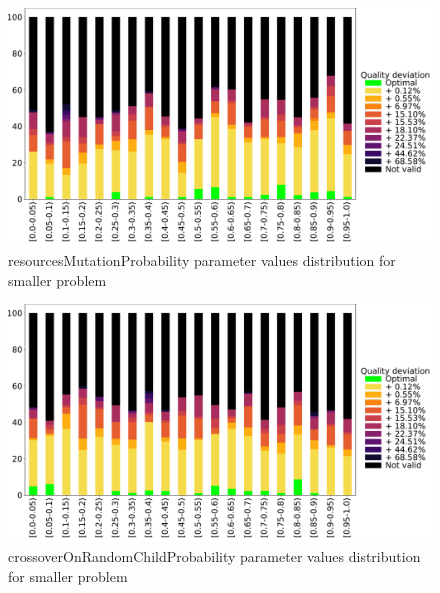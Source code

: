 \begin{figure}
	\centering
	\includegraphics[width=\textwidth]{images/DistrObj/resourcesMutationProbability.pdf}
	\caption[resourcesMutationProbability parameter values distribution for smaller problem]{resourcesMutationProbability parameter values distribution for smaller problem}
	\label{fig:resourcesMutationProbability_Obj}
\end{figure}
\begin{figure}
	\centering
	\includegraphics[width=\textwidth]{images/DistrObj/crossoverOnRandomChildProbability.pdf}
	\caption[crossoverOnRandomChildProbability parameter values distribution for smaller problem]{crossoverOnRandomChildProbability parameter values distribution for smaller problem}
	\label{fig:crossoverOnRandomChildProbability_Obj}
\end{figure}
